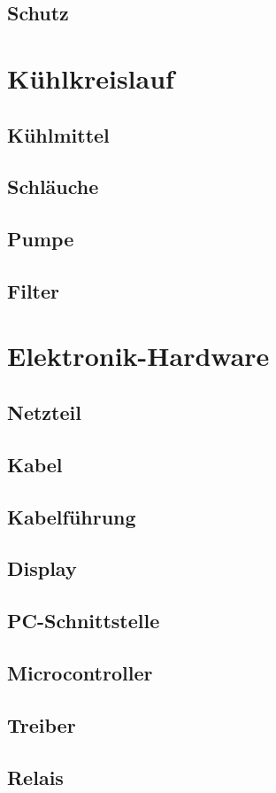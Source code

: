 \documentclass[
	a4paper,
	smallheadings,
	german,
	]
	{scrreprt}
\begin{document}
\subsection{Schutz}
\section{Kühlkreislauf}
	\subsection{Kühlmittel}
	\subsection{Schläuche}
	\subsection{Pumpe}
	\subsection{Filter}
\section{Elektronik-Hardware}
	\subsection{Netzteil}
	\subsection{Kabel}
	\subsection{Kabelführung}
	\subsection{Display}
	\subsection{PC-Schnittstelle}
	\subsection{Microcontroller}
	\subsection{Treiber}
	\subsection{Relais}
\end{document}
